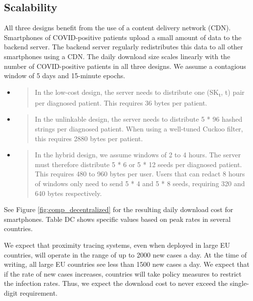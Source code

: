 \documentclass{article}
\begin{document}
\subsection{Scalability}\label{scalability-3}

All three designs benefit from the use of a content delivery network
(CDN). Smartphones of COVID-positive patients upload a small amount of
data to the backend server. The backend server regularly redistributes
this data to all other smartphones using a CDN. The daily download size
scales linearly with the number of COVID-positive patients in all three
designs. We assume a contagious window of 5 days and 15-minute epochs.

\begin{itemize}
\item
  \begin{quote}
  In the low-cost design, the server needs to distribute one
  (SK\textsubscript{t}, t) pair per diagnosed patient. This requires 36
  bytes per patient.
  \end{quote}
\item
  \begin{quote}
  In the unlinkable design, the server needs to distribute 5 * 96 hashed
  strings per diagnosed patient. When using a well-tuned Cuckoo filter,
  this requires 2880 bytes per patient.
  \end{quote}
\item
  \begin{quote}
  In the hybrid design, we assume windows of 2 to 4 hours. The server
  must therefore distribute 5 * 6 or 5 * 12 seeds per diagnosed patient.
  This requires 480 to 960 bytes per user. Users that can redact 8 hours
  of windows only need to send 5 * 4 and 5 * 8 seeds, requiring 320 and
  640 bytes respectively.
  \end{quote}
\end{itemize}

See Figure \ref{fig:comp_decentralized} for the resulting daily download cost for smartphones.
Table DC shows specific values based on peak rates in several countries.

We expect that proximity tracing systems, even when deployed in large EU
countries, will operate in the range of up to 2000 new cases a day. At
the time of writing, all large EU countries see less than 1500 new cases
a day. We expect that if the rate of new cases increases, countries will
take policy measures to restrict the infection rates. Thus, we expect
the download cost to never exceed the single-digit requirement.
\end{document}
